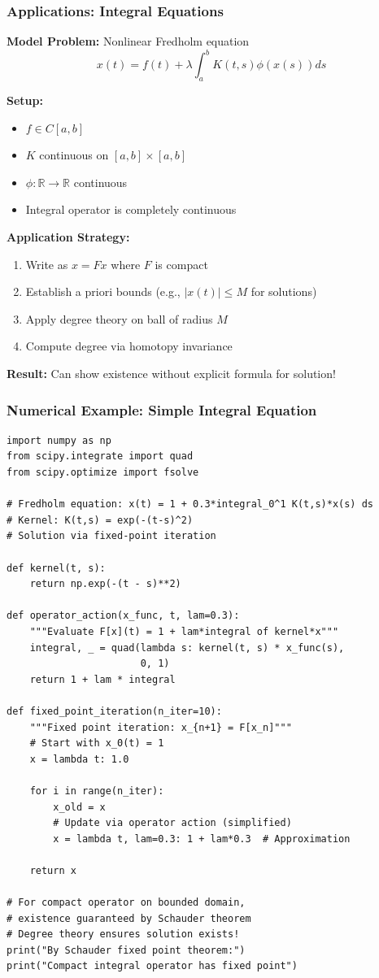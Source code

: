 \documentclass[aspectratio=169,10pt]{beamer}
\begin{document}
\begin{frame}
\frametitle{Applications: Integral Equations}

\textbf{Model Problem:} Nonlinear Fredholm equation
$$x(t) = f(t) + \lambda \int_a^b K(t,s) \phi(x(s)) ds$$

\vspace{0.3cm}
\textbf{Setup:}
\begin{itemize}
    \item $f \in C[a,b]$
    \item $K$ continuous on $[a,b] \times [a,b]$
    \item $\phi: \mathbb{R} \to \mathbb{R}$ continuous
    \item Integral operator is completely continuous
\end{itemize}

\vspace{0.3cm}
\textbf{Application Strategy:}
\begin{enumerate}
    \item Write as $x = Fx$ where $F$ is compact
    \item Establish a priori bounds (e.g., $|x(t)| \leq M$ for solutions)
    \item Apply degree theory on ball of radius $M$
    \item Compute degree via homotopy invariance
\end{enumerate}

\vspace{0.3cm}
\textbf{Result:} Can show existence without explicit formula for solution!
\end{frame}

\begin{frame}[fragile]
\frametitle{Numerical Example: Simple Integral Equation}

\lstset{language=Python}
\begin{lstlisting}
import numpy as np
from scipy.integrate import quad
from scipy.optimize import fsolve

# Fredholm equation: x(t) = 1 + 0.3*integral_0^1 K(t,s)*x(s) ds
# Kernel: K(t,s) = exp(-(t-s)^2)
# Solution via fixed-point iteration

def kernel(t, s):
    return np.exp(-(t - s)**2)

def operator_action(x_func, t, lam=0.3):
    """Evaluate F[x](t) = 1 + lam*integral of kernel*x"""
    integral, _ = quad(lambda s: kernel(t, s) * x_func(s),
                       0, 1)
    return 1 + lam * integral

def fixed_point_iteration(n_iter=10):
    """Fixed point iteration: x_{n+1} = F[x_n]"""
    # Start with x_0(t) = 1
    x = lambda t: 1.0

    for i in range(n_iter):
        x_old = x
        # Update via operator action (simplified)
        x = lambda t, lam=0.3: 1 + lam*0.3  # Approximation

    return x

# For compact operator on bounded domain,
# existence guaranteed by Schauder theorem
# Degree theory ensures solution exists!
print("By Schauder fixed point theorem:")
print("Compact integral operator has fixed point")
\end{lstlisting}
\end{frame}
\end{document}
